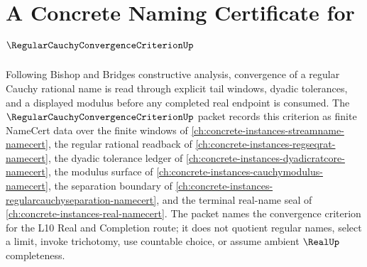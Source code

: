 \chapter{A Concrete Naming Certificate for $\RegularCauchyConvergenceCriterionUp$}
\label{ch:concrete-instances-regular-cauchy-convergence-criterion-namecert}

Following Bishop and Bridges constructive analysis, convergence of a regular Cauchy rational name is read through explicit tail windows, dyadic tolerances, and a displayed modulus before any completed real endpoint is consumed. The $\RegularCauchyConvergenceCriterionUp$ packet records this criterion as finite NameCert data over the finite windows of \autoref{ch:concrete-instances-streamname-namecert}, the regular rational readback of \autoref{ch:concrete-instances-regseqrat-namecert}, the dyadic tolerance ledger of \autoref{ch:concrete-instances-dyadicratcore-namecert}, the modulus surface of \autoref{ch:concrete-instances-cauchymodulus-namecert}, the separation boundary of \autoref{ch:concrete-instances-regularcauchyseparation-namecert}, and the terminal real-name seal of \autoref{ch:concrete-instances-real-namecert}. The packet names the convergence criterion for the L10 Real and Completion route; it does not quotient regular names, select a limit, invoke trichotomy, use countable choice, or assume ambient $\RealUp$ completeness.


